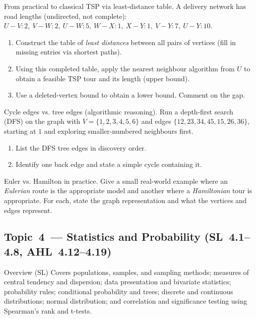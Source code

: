 \documentclass[11pt]{article}
\def\textbf#1{#1}%
\newcommand{\tocsubsection}[1]{\subsection{#1}}
\newcounter{question}
\begin{document}
\begin{question}
\textbf{From practical to classical TSP via least-distance table.}
A delivery network has road lengths (undirected, not complete): 
$U\!-\!V:2,\ V\!-\!W:2,\ U\!-\!W:5,\ W\!-\!X:1,\ X\!-\!Y:1,\ V\!-\!Y:7,\ U\!-\!Y:10$.
\begin{enumerate}
  \item Construct the table of \emph{least distances} between all pairs of vertices (fill in missing entries via shortest paths).
  \item Using this completed table, apply the nearest neighbour algorithm from $U$ to obtain a feasible TSP tour and its length (upper bound).
  \item Use a deleted-vertex bound to obtain a lower bound. Comment on the gap.
\end{enumerate}
\end{question}

\begin{question}
\textbf{Cycle edges vs. tree edges (algorithmic reasoning).}
Run a depth-first search (DFS) on the graph with $V=\{1,2,3,4,5,6\}$ and edges
$\{12,23,34,45,15,26,36\}$, starting at $1$ and exploring smaller-numbered neighbours first.
\begin{enumerate}
  \item List the DFS tree edges in discovery order.
  \item Identify one back edge and state a simple cycle containing it.
\end{enumerate}
\end{question}

\begin{question}
\textbf{Euler vs. Hamilton in practice.}
Give a small real-world example where an \emph{Eulerian} route is the appropriate model and another where a \emph{Hamiltonian} tour is appropriate. For each, state the graph representation and what the vertices and edges represent.
\end{question}





\tocsubsection{Topic 4 — Statistics and Probability (SL 4.1–4.8, AHL 4.12–4.19)}
\textbf{Overview (SL)}  
Covers populations, samples, and sampling methods; measures of central tendency and dispersion; data presentation and bivariate statistics; probability rules; conditional probability and trees; discrete and continuous distributions; normal distribution; and correlation and significance testing using Spearman’s rank and t-tests.
\end{document}
